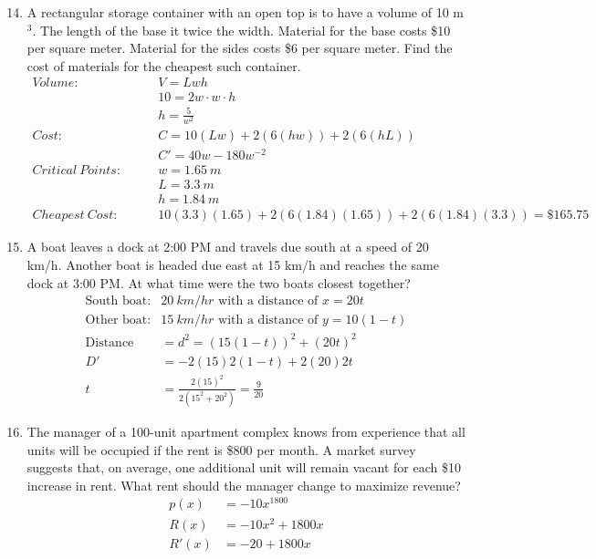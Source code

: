 \documentclass{article}
\begin{document}
\begin{enumerate}
\setcounter{enumi}{13}
	\item A rectangular storage container with an open top is to have a volume of 10 m$^3$. The length of the base it twice the width. Material for the base costs \$10 per square meter. Material for the sides costs \$6 per square meter. Find the cost of materials for the cheapest such container.$$\begin{align}
		Volume: \qquad & V = Lwh\\
		&10 = 2w\cdot w \cdot h\\
		&h = \frac{5}{w^2}\\
		Cost: \qquad & C = 10(Lw) + 2(6(hw))+2(6(hL))\\
		& C' = 40w -180w^{-2}\\
		Critical\ Points: \qquad & w = 1.65\ m\\
		& L = 3.3\ m\\
		& h = 1.84\ m\\
		Cheapest\ Cost: \qquad & 10(3.3)(1.65)+2(6(1.84)(1.65))+2(6(1.84)(3.3)) = \$165.75
	\end{align}$$
\setcounter{enumi}{33}
	\item A boat leaves a dock at 2:00 PM and travels due south at a speed of 20 km/h. Another boat is headed due east at 15 km/h and reaches the same dock at 3:00 PM. At what time were the two boats closest together?
	$$\begin{align}
		\text{South boat:} & 20\ km/hr \text{ with a distance of } x=20t\\
		\text{Other boat:} & 15\ km/hr \text{ with a distance of } y=10(1-t)\\
		\text{Distance }&= d^2 = (15(1-t))^2+(20t)^2\\
		D′ &= −2(15)2(1 − t) + 2(20)2t \\
		t&=\frac{2(15)^2}{2(15^2+20^2)}=\boxed{\frac{9}{20}}
	\end{align}$$
\setcounter{enumi}{47}
	\item The manager of a 100-unit apartment complex knows from experience that all units will be occupied if the rent is \$800 per month. A market survey suggests that, on average, one additional unit will remain vacant for each \$10 increase in rent. What rent should the manager change to maximize revenue?
	$$\begin{align}
		p(x)&=-10x^1800\\
		R(x)&=-10x^2+1800x\\
		R'(x)&=-20+1800x\\

\end{align}$$
\end{enumerate}
\end{document}
